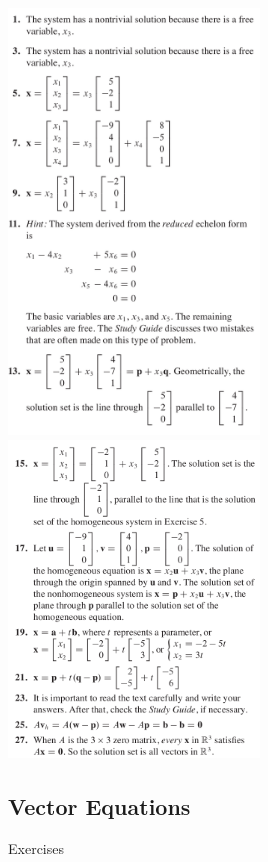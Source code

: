 \documentclass[a4paper,11pt,reqno]{amsart}
\numberwithin{equation}{section}
\begin{document}
\includegraphics[width=0.5\textwidth]{exercises/sle_ans1.png}
\includegraphics[width=0.5\textwidth]{exercises/sle_ans2.png}

\newpage


\subsection{Vector Equations}
Exercises
\end{document}
